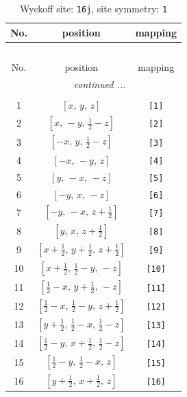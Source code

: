 \documentclass[fleqn,8pt]{jsarticle}
\begin{document}
\begin{longtable}{ccc}
\caption{Wyckoff site: {\tt 16j}, site symmetry: {\tt 1}}
 \\
 \hline \hline
No. & position & mapping \\ \hline \endfirsthead

\multicolumn{2}{l}{\tablename\ \thetable{}} \\
 \hline \hline
No. & position & mapping \\ \hline \endhead

 \hline \hline
\multicolumn{2}{r}{\footnotesize\it continued ...} \\ \endfoot

 \hline \hline
\multicolumn{2}{r}{} \\ \endlastfoot

1 & $\left[ x,\, y,\, z \right]$ & {\tt [1]} \\ \hline
2 & $\left[ x,\, - y,\, \frac{1}{2} - z \right]$ & {\tt [2]} \\ \hline
3 & $\left[ - x,\, y,\, \frac{1}{2} - z \right]$ & {\tt [3]} \\ \hline
4 & $\left[ - x,\, - y,\, z \right]$ & {\tt [4]} \\ \hline
5 & $\left[ y,\, - x,\, - z \right]$ & {\tt [5]} \\ \hline
6 & $\left[ - y,\, x,\, - z \right]$ & {\tt [6]} \\ \hline
7 & $\left[ - y,\, - x,\, z + \frac{1}{2} \right]$ & {\tt [7]} \\ \hline
8 & $\left[ y,\, x,\, z + \frac{1}{2} \right]$ & {\tt [8]} \\ \hline
9 & $\left[ x + \frac{1}{2},\, y + \frac{1}{2},\, z + \frac{1}{2} \right]$ & {\tt [9]} \\ \hline
10 & $\left[ x + \frac{1}{2},\, \frac{1}{2} - y,\, - z \right]$ & {\tt [10]} \\ \hline
11 & $\left[ \frac{1}{2} - x,\, y + \frac{1}{2},\, - z \right]$ & {\tt [11]} \\ \hline
12 & $\left[ \frac{1}{2} - x,\, \frac{1}{2} - y,\, z + \frac{1}{2} \right]$ & {\tt [12]} \\ \hline
13 & $\left[ y + \frac{1}{2},\, \frac{1}{2} - x,\, \frac{1}{2} - z \right]$ & {\tt [13]} \\ \hline
14 & $\left[ \frac{1}{2} - y,\, x + \frac{1}{2},\, \frac{1}{2} - z \right]$ & {\tt [14]} \\ \hline
15 & $\left[ \frac{1}{2} - y,\, \frac{1}{2} - x,\, z \right]$ & {\tt [15]} \\ \hline
16 & $\left[ y + \frac{1}{2},\, x + \frac{1}{2},\, z \right]$ & {\tt [16]} \\
\end{longtable}
\end{document}

